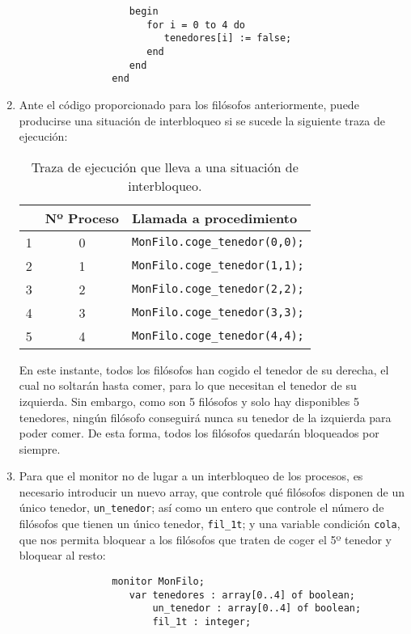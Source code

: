 \begin{ejercicio}
\begin{enumerate}
\begin{verbatim}
                   begin
                      for i = 0 to 4 do 
                         tenedores[i] := false;
                      end
                   end
                end
            \end{verbatim}
        \item Ante el código proporcionado para los filósofos anteriormente, puede producirse una situación de interbloqueo si se sucede la siguiente traza de ejecución:
            \begin{table}[H]
            \centering
            \begin{tabular}{|c|c|l|}
                \hline
                 & Nº Proceso & Llamada a procedimiento \\
                \hline
                1 & 0 & \verb|MonFilo.coge_tenedor(0,0);| \\
                \hline
                2 & 1 & \verb|MonFilo.coge_tenedor(1,1);| \\
                \hline
                3 & 2 & \verb|MonFilo.coge_tenedor(2,2);| \\
                \hline
                4 & 3 & \verb|MonFilo.coge_tenedor(3,3);| \\
                \hline
                5 & 4 & \verb|MonFilo.coge_tenedor(4,4);| \\
                \hline
            \end{tabular}
            \caption{Traza de ejecución que lleva a una situación de interbloqueo.}
            \label{etiqueta}
            \end{table}
            En este instante, todos los filósofos han cogido el tenedor de su derecha, el cual no soltarán hasta comer, para lo que necesitan el tenedor de su izquierda. Sin embargo, como son 5 filósofos y solo hay disponibles 5 tenedores, ningún filósofo conseguirá nunca su tenedor de la izquierda para poder comer. De esta forma, todos los filósofos quedarán bloqueados por siempre.
        \item Para que el monitor no de lugar a un interbloqueo de los procesos, es necesario introducir un nuevo array, que controle qué filósofos disponen de un único tenedor, \verb|un_tenedor|; así como un entero que controle el número de filósofos que tienen un único tenedor, \verb|fil_1t|; y una variable condición \verb|cola|, que nos permita bloquear a los filósofos que traten de coger el 5º tenedor y bloquear al resto:
            \begin{verbatim}
                monitor MonFilo;
                   var tenedores : array[0..4] of boolean;
                       un_tenedor : array[0..4] of boolean;
                       fil_1t : integer;


\end{verbatim}
\end{enumerate}
\end{ejercicio}
